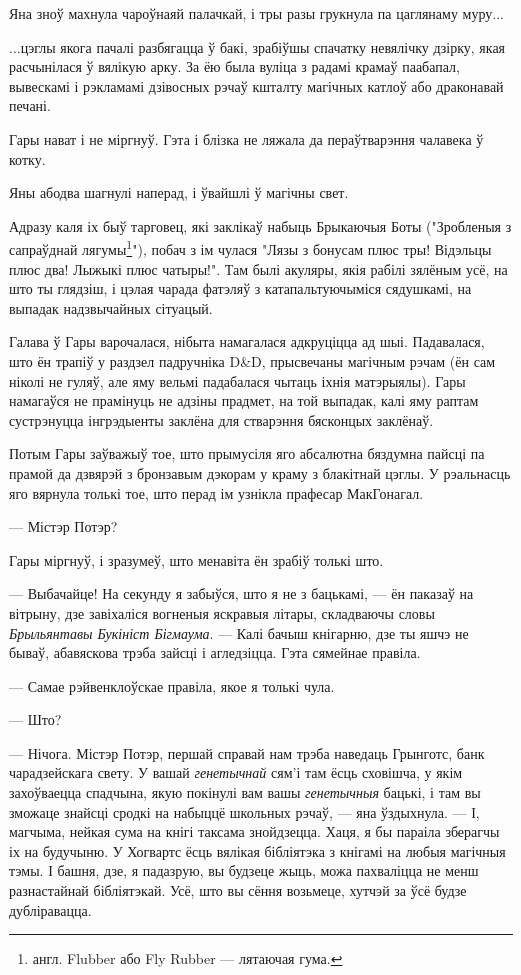 Яна зноў махнула чароўнаяй палачкай, і тры разы грукнула па цаглянаму муру...

...цэглы якога пачалі разбягацца ў бакі, зрабіўшы спачатку невялічку дзірку, якая 
расчынілася ў вялікую арку. За ёю была вуліца з радамі крамаў паабапал, вывескамі і 
рэкламамі дзівосных рэчаў кшталту магічных катлоў або драконавай печані.

Гары нават і не міргнуў. Гэта і блізка не ляжала да пераўтварэння чалавека ў котку.

Яны абодва шагнулі наперад, і ўвайшлі ў магічны свет.

Адразу каля іх быў тарговец, які заклікаў набыць Брыкаючыя Боты ("Зробленыя з сапраўднай
лягумы\footnote{{} англ. Flubber або Fly Rubber --- лятаючая гума.}"), побач з ім чулася 
"Лязы з бонусам плюс тры! Відэльцы плюс два! Лыжыкі плюс чатыры!". Там былі акуляры, якія
рабілі зялёным усё, на што ты глядзіш, і цэлая чарада фатэляў з катапальтуючыміся
сядушкамі, на выпадак надзвычайных сітуацый.

Галава ў Гары варочалася, нібыта намагалася адкруціцца ад шыі. Падавалася, што ён трапіў
у раздзел падручніка D\&D, прысвечаны магічным рэчам (ён сам ніколі не гуляў, але яму вельмі 
падабалася чытаць іхнія матэрыялы). Гары намагаўся не прамінуць не адзіны прадмет, на той выпадак,
калі яму раптам сустрэнуцца інгрэдыенты заклёна для стварэння бясконцых заклёнаў.

Потым Гары заўважыў тое, што прымусіля яго абсалютна бяздумна пайсці па прамой да дзвярэй 
з бронзавым дэкорам у краму з блакітнай цэглы. У рэальнасць яго вярнула толькі тое, што перад
ім узнікла прафесар МакГонагал.

--- Містэр Потэр?

Гары міргнуў, і зразумеў, што менавіта ён зрабіў толькі што.

--- Выбачайце! На секунду я забыўся, што я не з бацькамі, --- ён паказаў на вітрыну, дзе
завіхаліся вогненыя яскравыя літары, складваючы словы \emph{Брыльянтавы Букініст Бігмаума}.
--- Калі бачыш кнігарню, дзе ты яшчэ не бываў, абавяскова трэба зайсці і агледзіцца. 
Гэта сямейнае правіла. 

--- Самае рэйвенклоўскае правіла, якое я толькі чула.

--- Што?

--- Нічога. Містэр Потэр, першай справай нам трэба наведаць Грынготс, банк чарадзейскага свету.
У вашай \emph{генетычнай} сям'і там ёсць сховішча, у якім захоўваецца спадчына, якую
покінулі вам вашы \emph{генетычныя} бацькі, і там вы зможаце знайсці сродкі на набыццё
школьных рэчаў, --- яна ўздыхнула. --- І, магчыма, нейкая сума на кнігі таксама знойдзецца.
Хаця, я бы параіла зберагчы іх на будучыню. У Хогвартс ёсць вялікая бібліятэка з кнігамі на 
любыя магічныя тэмы. І башня, дзе, я падазрую, вы будзеце жыць, можа пахваліцца не менш
разнастайнай бібліятэкай. Усё, што вы сёння возьмеце, хутчэй за ўсё будзе дубліравацца.

